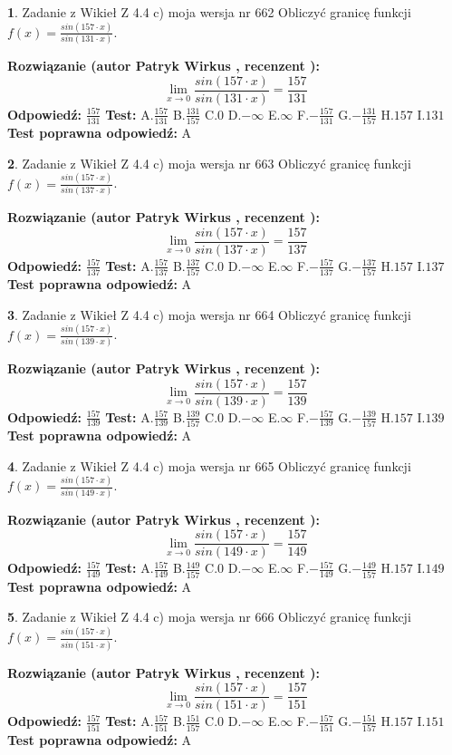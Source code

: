 \documentclass[12pt, a4paper]{article}
\theoremstyle{definition} %
\newtheorem{zad}{}
\newcommand{\zadStart}[1]{\begin{zad}#1\newline}
\newcommand{\zadStop}{\end{zad}}
\newcommand{\rozwStart}[2]{\noindent \textbf{Rozwiązanie (autor #1 , recenzent #2): }\newline}
\newcommand{\rozwStop}{\newline}
\newcommand{\odpStart}{\noindent \textbf{Odpowiedź:}\newline}
\newcommand{\odpStop}{\newline}
\newcommand{\testStart}{\noindent \textbf{Test:}\newline}
\newcommand{\testStop}{\newline}
\newcommand{\kluczStart}{\noindent \textbf{Test poprawna odpowiedź:}\newline}
\newcommand{\kluczStop}{\newline}
\begin{document}
\zadStart{Zadanie z Wikieł Z 4.4 c) moja wersja nr 662}
Obliczyć granicę funkcji $f(x)=\frac{sin(157\cdot x)}{sin(131\cdot x)}$.
\zadStop
\rozwStart{Patryk Wirkus}{}
$$\lim\limits_{x\to 0}\frac{sin(157\cdot x)}{sin(131\cdot x)}=
\frac{157}{131}$$
\rozwStop
\odpStart
$\frac{157}{131}$
\odpStop
\testStart
A.$\frac{157}{131}$
B.$\frac{131}{157}$
C.$0$
D.$-\infty$
E.$\infty$
F.$-\frac{157}{131}$
G.$-\frac{131}{157}$
H.$157$
I.$131$
\testStop
\kluczStart
A
\kluczStop



\zadStart{Zadanie z Wikieł Z 4.4 c) moja wersja nr 663}
Obliczyć granicę funkcji $f(x)=\frac{sin(157\cdot x)}{sin(137\cdot x)}$.
\zadStop
\rozwStart{Patryk Wirkus}{}
$$\lim\limits_{x\to 0}\frac{sin(157\cdot x)}{sin(137\cdot x)}=
\frac{157}{137}$$
\rozwStop
\odpStart
$\frac{157}{137}$
\odpStop
\testStart
A.$\frac{157}{137}$
B.$\frac{137}{157}$
C.$0$
D.$-\infty$
E.$\infty$
F.$-\frac{157}{137}$
G.$-\frac{137}{157}$
H.$157$
I.$137$
\testStop
\kluczStart
A
\kluczStop



\zadStart{Zadanie z Wikieł Z 4.4 c) moja wersja nr 664}
Obliczyć granicę funkcji $f(x)=\frac{sin(157\cdot x)}{sin(139\cdot x)}$.
\zadStop
\rozwStart{Patryk Wirkus}{}
$$\lim\limits_{x\to 0}\frac{sin(157\cdot x)}{sin(139\cdot x)}=
\frac{157}{139}$$
\rozwStop
\odpStart
$\frac{157}{139}$
\odpStop
\testStart
A.$\frac{157}{139}$
B.$\frac{139}{157}$
C.$0$
D.$-\infty$
E.$\infty$
F.$-\frac{157}{139}$
G.$-\frac{139}{157}$
H.$157$
I.$139$
\testStop
\kluczStart
A
\kluczStop



\zadStart{Zadanie z Wikieł Z 4.4 c) moja wersja nr 665}
Obliczyć granicę funkcji $f(x)=\frac{sin(157\cdot x)}{sin(149\cdot x)}$.
\zadStop
\rozwStart{Patryk Wirkus}{}
$$\lim\limits_{x\to 0}\frac{sin(157\cdot x)}{sin(149\cdot x)}=
\frac{157}{149}$$
\rozwStop
\odpStart
$\frac{157}{149}$
\odpStop
\testStart
A.$\frac{157}{149}$
B.$\frac{149}{157}$
C.$0$
D.$-\infty$
E.$\infty$
F.$-\frac{157}{149}$
G.$-\frac{149}{157}$
H.$157$
I.$149$
\testStop
\kluczStart
A
\kluczStop



\zadStart{Zadanie z Wikieł Z 4.4 c) moja wersja nr 666}
Obliczyć granicę funkcji $f(x)=\frac{sin(157\cdot x)}{sin(151\cdot x)}$.
\zadStop
\rozwStart{Patryk Wirkus}{}
$$\lim\limits_{x\to 0}\frac{sin(157\cdot x)}{sin(151\cdot x)}=
\frac{157}{151}$$
\rozwStop
\odpStart
$\frac{157}{151}$
\odpStop
\testStart
A.$\frac{157}{151}$
B.$\frac{151}{157}$
C.$0$
D.$-\infty$
E.$\infty$
F.$-\frac{157}{151}$
G.$-\frac{151}{157}$
H.$157$
I.$151$
\testStop
\kluczStart
A
\kluczStop
\end{document}
